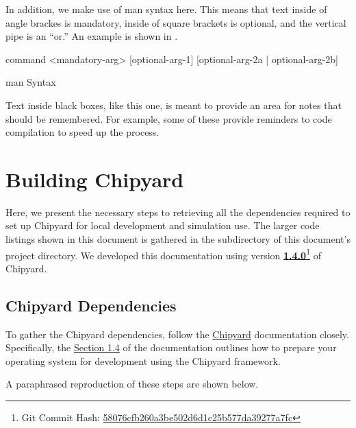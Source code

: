 In addition, we make use of \gls{man} syntax here.
This means that text inside of angle brackes is mandatory, inside of square brackets is optional, and the vertical pipe is an ``or.''
An example is shown in .

\begin{listing}[h!tbp]
\begin{bashsource}
command <mandatory-arg> [optional-arg-1] [optional-arg-2a | optional-arg-2b]
\end{bashsource}
\caption{\gls{man} Syntax}
\label{lst:man_Syntax}
\end{listing}

\begin{blackbox}
  Text inside black boxes, like this one, is meant to provide an area for notes that should be remembered.
  For example, some of these provide reminders to  code compilation to speed up the process.
\end{blackbox}

\section{Building Chipyard}\label{sec:Building_Chipyard}
Here, we present the necessary steps to retrieving all the dependencies required to set up Chipyard for local development and simulation use.
The larger code listings shown in this document is gathered in the  subdirectory of this document's project directory.
We developed this documentation using version \href{https://github.com/ucb-bar/chipyard/releases/tag/1.4.0}{\textbf{1.4.0}}\footnote{Git Commit Hash: \href{https://github.com/ucb-bar/chipyard/commit/58076cfb260a3be502d6d1c25b577da39277a7fc}{58076cfb260a3be502d6d1c25b577da39277a7fc}} of Chipyard.

\subsection{Chipyard Dependencies}\label{sec:Chipyard_Dependencies}
To gather the Chipyard dependencies, follow the \href{https://chipyard.readthedocs.io/en/latest/}{Chipyard} documentation closely.
Specifically, the \href{https://chipyard.readthedocs.io/en/latest/Chipyard-Basics/Initial-Repo-Setup.html}{Section 1.4} of the documentation outlines how to prepare your operating system for development using the Chipyard framework.

A paraphrased reproduction of these steps are shown below.

